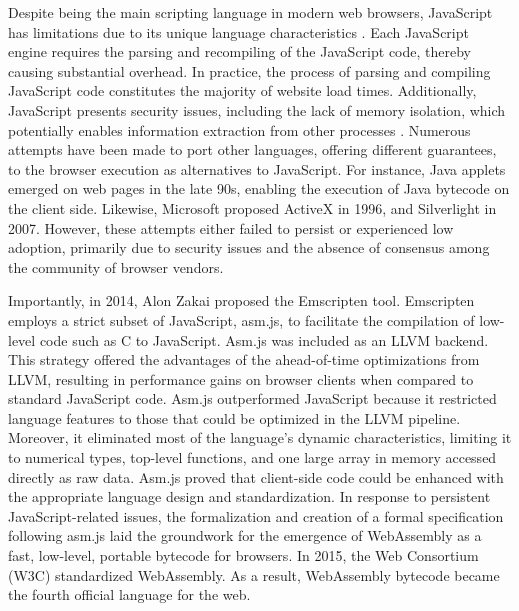 Despite being the main scripting language in modern web browsers, JavaScript has limitations due to its unique language characteristics \cite{mulazzani2013fast}.
Each JavaScript engine requires the parsing and recompiling of the JavaScript code, thereby causing substantial overhead.
In practice, the process of parsing and compiling JavaScript code constitutes the majority of website load times.
Additionally, JavaScript presents security issues, including the lack of memory isolation, which potentially enables information extraction from other processes \cite{10.1145/1190216.1190252, 10.1145/3412841.3442001}.
Numerous attempts have been made to port other languages, offering different guarantees, to the browser execution as alternatives to JavaScript.
For instance, Java applets emerged on web pages in the late 90s, enabling the execution of Java bytecode on the client side.
Likewise, Microsoft proposed ActiveX in 1996, and Silverlight in 2007.
However, these attempts either failed to persist or experienced low adoption, primarily due to security issues and the absence of consensus among the community of browser vendors.


Importantly, in 2014, Alon Zakai \etal proposed the Emscripten tool.
Emscripten employs a strict subset of JavaScript, asm.js, to facilitate the compilation of low-level code such as C to JavaScript.
Asm.js was included as an LLVM backend.
This strategy offered the advantages of the ahead-of-time optimizations from LLVM, resulting in performance gains on browser clients when compared to standard JavaScript code.
Asm.js outperformed JavaScript because it restricted language features to those that could be optimized in the LLVM pipeline. 
Moreover, it eliminated most of the language's dynamic characteristics, limiting it to numerical types, top-level functions, and one large array in memory accessed directly as raw data.
Asm.js proved that client-side code could be enhanced with the appropriate language design and standardization.
In response to persistent JavaScript-related issues, the formalization and creation of a formal specification following asm.js laid the groundwork for the emergence of WebAssembly as a fast, low-level, portable bytecode for browsers.
In 2015, the Web Consortium (W3C) standardized WebAssembly.
As a result, WebAssembly bytecode became the fourth official language for the web.



